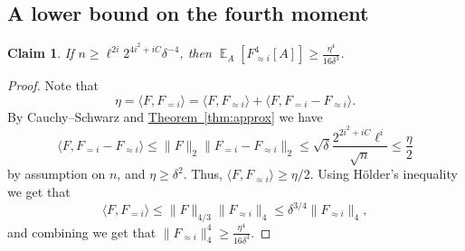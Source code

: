 \documentclass[11pt]{article}
\newcommand{\expref}[2]{\texorpdfstring{\hyperref[#2]{#1~\ref{#2}}}{#1~\ref{#2}}}
\newtheorem{claim}[theorem]{Claim}
\newcommand\Expect[2]{{\mathop{\mathbb{E}}_{#1}\left[ {#2} \right]}}
\newcommand\norm[1]{\| #1 \|}
\newcommand\inner[2]{\langle{#1},{#2}\rangle}
\renewcommand\geq{\geqslant}
\renewcommand\leq{\leqslant}
\newcommand\lvlfn[2]{{#1}_{={#2}}}
\newcommand\approxlvlfn[2]{{#1}_{\approx{#2}}}
\begin{document}
\subsection{A lower bound on the fourth moment}
\begin{claim}\label{claim:fourth_lower}
  If $n\geq \ell^{2i} 2^{4i^2 + iC} \delta^{-4}$, then $\Expect{A}{\approxlvlfn{F}{i}^4[A]}\geq \frac{\eta^4}{16\delta^3}$.
\end{claim}
\begin{proof}
  Note that
  \[
  \eta
  = \inner{F}{\lvlfn{F}{i}}
  = \inner{F}{\approxlvlfn{F}{i}}
  + \inner{F}{\lvlfn{F}{i}-\approxlvlfn{F}{i}}.
  \]
  By %
Cauchy--Schwarz   %
and \expref{Theorem}{thm:approx} we have
  \[
  \inner{F}{\lvlfn{F}{i}-\approxlvlfn{F}{i}}
  \leq
  \norm{F}_2\norm{\lvlfn{F}{i}-\approxlvlfn{F}{i}}_2
  \leq \sqrt{\delta}\frac{2^{2i^2+iC} \ell^{i}}{\sqrt{n}}
  \leq \frac{\eta}{2}
  \]
  by assumption on $n$, and $\eta\geq \delta^2$. Thus, $\inner{F}{\approxlvlfn{F}{i}}\geq \eta/2$. Using H\"{o}lder's inequality we get that
  \[
  \inner{F}{\lvlfn{F}{i}}\leq \norm{F}_{4/3}\norm{\approxlvlfn{F}{i}}_4 \leq \delta^{3/4}\norm{\approxlvlfn{F}{i}}_4,
  \]
  and combining we get that $\norm{\approxlvlfn{F}{i}}_4^4\geq \frac{\eta^4}{16\delta^3}$.
\end{proof}
\end{document}
